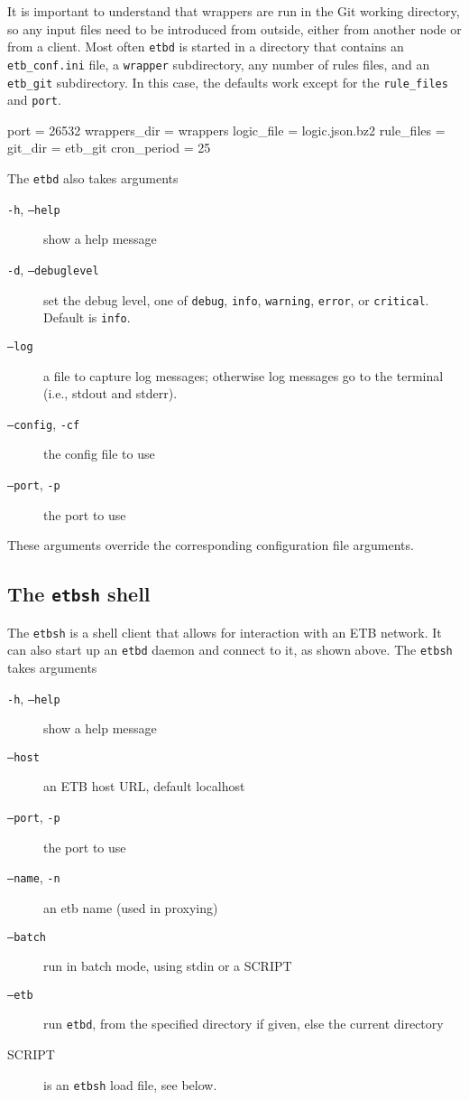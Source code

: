 \documentclass{report}
\begin{document}
It is important to understand that wrappers are run in the Git working
directory, so any input files need to be introduced from outside, either
from another node or from a client.  Most often \texttt{etbd} is started
in a directory that contains an \texttt{etb\_conf.ini} file, a
\texttt{wrapper} subdirectory, any number of rules files, and an
\texttt{etb\_git} subdirectory.  In this case, the defaults work except
for the \texttt{rule\_files} and \texttt{port}.
\begin{bashcode}
[etb]
port = 26532
wrappers_dir = wrappers
logic_file = logic.json.bz2
rule_files =
git_dir = etb_git
cron_period = 25
\end{bashcode}
The \texttt{etbd} also takes arguments
\begin{description}
\item[\texttt{-h}, \texttt{--help}] show a help message
\item[\texttt{-d}, \texttt{--debuglevel}] set the debug level, one of
\texttt{debug}, \texttt{info}, \texttt{warning}, \texttt{error}, or
\texttt{critical}.  Default is \texttt{info}.
\item[\texttt{--log}] a file to capture log messages; otherwise log
messages go to the terminal (i.e., stdout and stderr).
\item[\texttt{--config}, \texttt{-cf}] the config file to use
\item[\texttt{--port}, \texttt{-p}] the port to use
\end{description}
These arguments override the corresponding configuration file arguments.

\subsection{The \texttt{etbsh} shell}
The \texttt{etbsh} is a shell client that allows for interaction with an
ETB network.  It can also start up an \texttt{etbd} daemon and connect to
it, as shown above.  The \texttt{etbsh} takes arguments
\begin{description}
\item[\texttt{-h}, \texttt{--help}] show a help message
\item[\texttt{--host}] an ETB host URL, default localhost
\item[\texttt{--port}, \texttt{-p}] the port to use
\item[\texttt{--name}, \texttt{-n}] an etb name (used in proxying)
\item[\texttt{--batch}] run in batch mode, using stdin or a SCRIPT
\item[\texttt{--etb}] run \texttt{etbd}, from the specified directory if
given, else the current directory
\item[SCRIPT] is an \texttt{etbsh} load file, see below.
\end{description}
\end{document}
